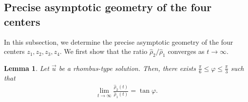 \documentclass[10pt,a4paper]{amsart}
\newtheorem{lemma}[theorem]{Lemma}
\numberwithin{equation}{section}
\begin{document}
\subsection{Precise asymptotic geometry of the four centers}

In this subsection, we determine the precise asymptotic geometry of the four centers $z_1,z_2,z_3,z_4$. We first show that the ratio $\hat{\rho}_2/\hat{\rho}_1$ converges as $t\to\infty$.

\begin{lemma}\label{hishinagasalem2}
Let $\vec{u}$ be a rhombus-type solution. Then, there exists $\frac{\pi}{6}\leq \varphi\leq \frac{\pi}{3}$ such that
\begin{align}\label{hoshinohiws1}
\lim_{t\to\infty}\frac{\hat{\rho}_2(t)}{\hat{\rho}_1(t)}=\tan{\varphi}.
\end{align}
\end{lemma}
\end{document}
